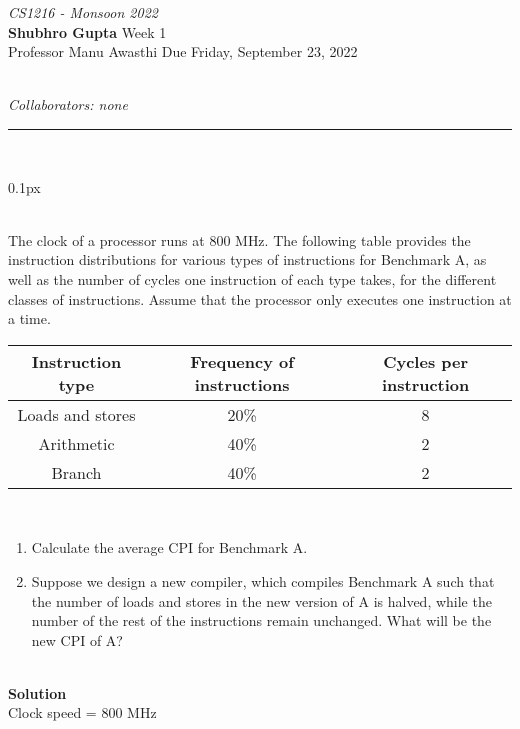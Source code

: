 \documentclass[11pt]{article}
\newcommand{\problem}[1]{\begin{adjustwidth}{0.1px}\noindent \framebox[1.2\width]{\large Problem #1}\end{adjustwidth} \bigskip\\}
\newcommand{\lesgo}[5]{
\begin{large}
\emph{#1}\smallskip \\
\textbf{Shubhro Gupta} \hfill Week #2\smallskip \\
Professor #3 \hfill Due #4\\
\end{large} \medskip \\
{\emph{Collaborators: #5}}\\
\hrule
\vspace{50px}
\\
}
\begin{document}
\lesgo{CS1216 - Monsoon 2022}{1}{Manu Awasthi}{Friday, September 23, 2022}{none}

\problem{1}
The clock of a processor runs at 800 MHz. The following table provides the instruction distributions for various types of instructions for Benchmark A, as well as the number of cycles one instruction of each type takes, for the different classes of instructions. Assume that the processor only executes one instruction at a time.
\\
\begin{center}
\begin{tabular}{ |c|c|c| } 
\hline
Instruction type & Frequency of instructions & Cycles per instruction\\
\hline
Loads and stores & 20\% & 8\\ 
Arithmetic & 40\% & 2\\ 
Branch & 40\% & 2\\
\hline
\end{tabular}
\end{center}
\\
\begin{enumerate}[label=(\Alph*)]
\item Calculate the average CPI for Benchmark A.
\item Suppose we design a new compiler, which compiles Benchmark A such that the number of  loads and stores in the new version of A is halved, while the number of the rest of the instructions remain unchanged. What will be the new CPI of A?
\end{enumerate}
\bigskip
\\
\textbf{Solution}\\
Clock speed = 800 MHz\\
\end{document}
